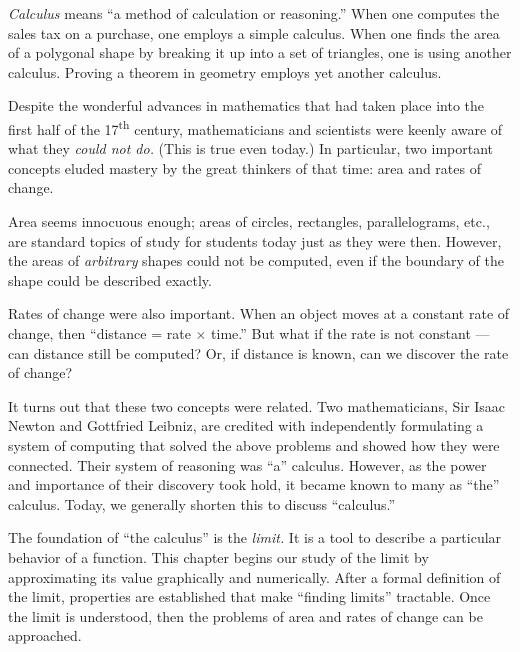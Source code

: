 
\toggletrue{isEarlyTrans}


\textit{Calculus} means ``a method of calculation or reasoning.'' When one computes the sales tax on a purchase, one employs a simple calculus. When one finds the area of a polygonal shape by breaking it up into a set of triangles, one is using another calculus. Proving a theorem in geometry employs yet another calculus.

Despite the wonderful advances in mathematics that had taken place into the first half of the 17\textsuperscript{th} century, mathematicians and scientists were keenly aware of what they \textit{could not do.} (This is true even today.) In particular, two important concepts eluded mastery by the great thinkers of that time: area and rates of change. 

Area seems innocuous enough; areas of circles, rectangles, parallelograms, etc., are standard topics of study for students today just as they were then. However, the areas of \textit{arbitrary} shapes could not be computed, even if the boundary of the shape could be described exactly. 

Rates of change were also important. When an object moves at a constant rate of change, then ``distance = rate $\times$ time.'' But what if the rate is not constant --- can distance still be computed? Or, if distance is known, can we discover the rate of change?

It turns out that these two concepts were related. Two mathematicians, Sir Isaac Newton and Gottfried Leibniz, are credited with independently formulating a system of computing that solved the above problems and showed how they were connected. Their system of reasoning was ``a'' calculus. However, as the power and importance of their discovery took hold, it became known to many as ``the'' calculus. Today, we generally shorten this to discuss ``calculus.''

The foundation of ``the calculus'' is the \textit{limit.} It is a tool to describe a particular behavior of a function. This chapter begins our study of the limit by approximating its value graphically and numerically. After a formal definition of the limit, properties are established that make ``finding limits'' tractable. Once the limit is understood, then the problems of area and rates of change can be approached.









